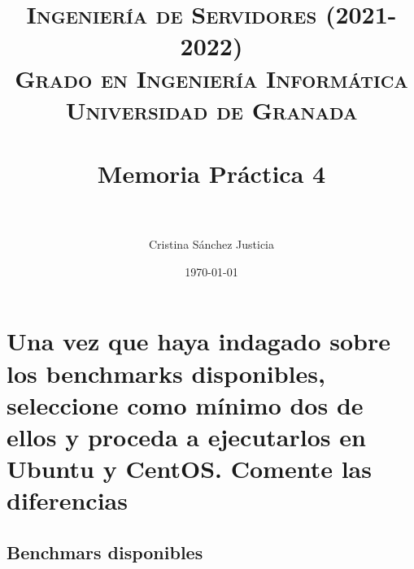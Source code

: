 


\title{	
\normalfont \normalsize 
\textsc{\textbf{Ingeniería de Servidores (2021-2022)} \\ Grado en Ingeniería Informática \\ Universidad de Granada} \\ [25pt] %
\horrule{0.5pt} \\[0.4cm] %
\huge Memoria Práctica 4 \\ %
\horrule{2pt} \\[0.5cm] %
}

\author{Cristina Sánchez Justicia} %

\date{\normalsize\today} %




\maketitle %

\newpage %

\tableofcontents %

\listoffigures

\listoftables


\section{Una vez que haya indagado sobre los benchmarks disponibles, seleccione como mínimo dos de ellos y proceda a ejecutarlos en Ubuntu y CentOS.
Comente las diferencias}

\subsection{Benchmars disponibles}


